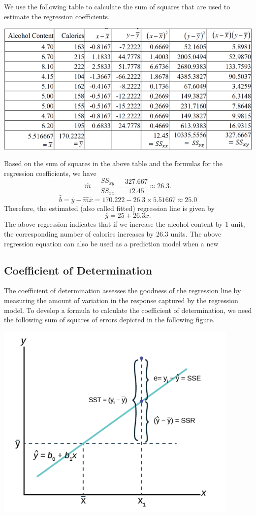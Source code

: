 \documentclass[
]{book}
\begin{document}
We use the following table to calculate the sum of squares that are used to estimate the regression coefficients.

\begin{center}\includegraphics[width=0.6\linewidth]{week12/example07Answer} \end{center}

Based on the sum of squares in the above table and the formulas for the regression coefficients, we have
\[
\hat{m} = \frac{SS_{xy}}{SS_{xx}} = \frac{327.667}{12.45} \approx 26.3.
\]
\[
\hat{b} = \bar{y} - \hat{m}\bar{x} = 170.222 -26.3 \times 5.51667 \approx 25.0
\]
Therefore, the estimated (also called fitted) regression line is given by
\[
\hat{y} = 25 + 26.3 x.
\]
The above regression indicates that if we increase the alcohol content by 1 unit, the corresponding number of calories increases by 26.3 units. The above regression equation can also be used as a prediction model when a new

\hypertarget{coefficient-of-determination}{%
\subsection{Coefficient of Determination}\label{coefficient-of-determination}}

The coefficient of determination assesses the goodness of the regression line by measuring the amount of variation in the response captured by the regression model. To develop a formula to calculate the coefficient of determination, we need the following sum of squares of errors depicted in the following figure.

\begin{center}\includegraphics[width=0.4\linewidth]{week12/Rsq} \end{center}
\end{document}
